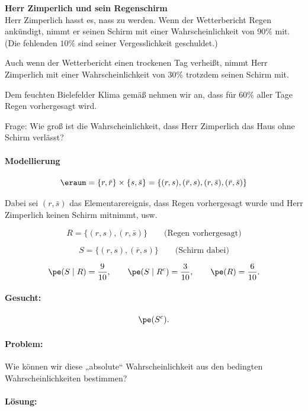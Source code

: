 \begin{bsp}
    \textbf{Herr Zimperlich und sein Regenschirm}   \\
    Herr Zimperlich hasst es, nass zu werden.
    Wenn der Wetterbericht Regen ankündigt, nimmt er seinen Schirm mit einer Wahrscheinlichkeit von \(90\%\) mit.
    (Die fehlenden \(10\%\) sind seiner Vergesslichkeit geschuldet.)

    Auch wenn der Wetterbericht einen trockenen Tag verheißt, nimmt Herr Zimperlich mit einer Wahrscheinlichkeit von \(30\%\) trotzdem seinen Schirm mit.

    Dem feuchten Bielefelder Klima gemäß nehmen wir an, dass für \(60\%\) aller Tage Regen vorhergesagt wird.

    Frage: Wie groß ist die Wahrscheinlichkeit, dass Herr Zimperlich das Haus ohne Schirm verlässt?

    \paragraph{Modellierung}

    \[
        \eraum = \{r,\bar r\}\times\{s,\bar s\}
        = \{(r,s),(\bar r,s),(r,\bar s),(\bar r,\bar s)\}
    \]

    Dabei sei \((r,\bar s)\) das Elementarereignis, dass Regen vorhergesagt wurde und Herr Zimperlich keinen Schirm mitnimmt, usw.

    \[
        R=\{(r,s),(r,\bar s)\}
        \qquad\text{(Regen vorhergesagt)}
    \]

    \[
        S=\{(r,s),(\bar r,s)\}
        \qquad\text{(Schirm dabei)}
    \]

    \[
        \pe(S\mid R)=\frac{9}{10},
        \qquad
        \pe(S\mid R^c)=\frac{3}{10},
        \qquad
        \pe(R)=\frac{6}{10}.
    \]

    \paragraph{Gesucht:}

    \[
        \pe(S^c).
    \]

    \paragraph{Problem:} Wie können wir diese „absolute“ Wahrscheinlichkeit aus den bedingten Wahrscheinlichkeiten bestimmen?

    \paragraph{Lösung:}


\end{bsp}
